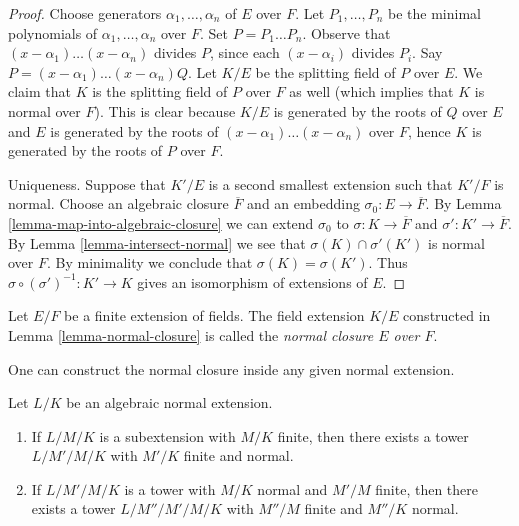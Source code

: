 \begin{proof}
Choose generators $\alpha_1, \ldots, \alpha_n$ of $E$ over $F$.
Let $P_1, \ldots, P_n$ be the minimal polynomials of
$\alpha_1, \ldots, \alpha_n$ over $F$. Set $P = P_1 \ldots P_n$.
Observe that $(x - \alpha_1) \ldots (x - \alpha_n)$ divides $P$, since
each $(x - \alpha_i)$ divides $P_i$. Say
$P = (x - \alpha_1) \ldots (x - \alpha_n)Q$.
Let $K/E$ be the splitting field of $P$ over $E$.
We claim that $K$ is the splitting field of $P$ over $F$ as well
(which implies that $K$ is normal over $F$).
This is clear because $K/E$ is generated by the roots of
$Q$ over $E$ and $E$ is generated by the roots of
$(x - \alpha_1) \ldots (x - \alpha_n)$ over $F$, hence
$K$ is generated by the roots of $P$ over $F$.

\medskip\noindent
Uniqueness. Suppose that $K'/E$ is a second smallest extension such that
$K'/F$ is normal. Choose an algebraic closure $\overline{F}$ and an
embedding $\sigma_0 : E \to \overline{F}$. By
Lemma \ref{lemma-map-into-algebraic-closure}
we can extend $\sigma_0$ to $\sigma : K \to \overline{F}$ and
$\sigma' : K' \to \overline{F}$.
By Lemma \ref{lemma-intersect-normal} we see that
$\sigma(K) \cap \sigma'(K')$ is normal over $F$.
By minimality we conclude that $\sigma(K) = \sigma(K')$.
Thus $\sigma \circ (\sigma')^{-1} : K' \to K$ gives an isomorphism
of extensions of $E$.
\end{proof}

\begin{definition}
\label{definition-normal-closure}
Let $E/F$ be a finite extension of fields. The field extension $K/E$
constructed in Lemma \ref{lemma-normal-closure}
is called the {\it normal closure $E$ over $F$}.
\end{definition}

\noindent
One can construct the normal closure inside any given normal extension.

\begin{lemma}
\label{lemma-normal-closure-inside-normal}
Let $L/K$ be an algebraic normal extension.
\begin{enumerate}
\item If $L/M/K$ is a subextension with $M/K$ finite, then there exists
a tower $L/M'/M/K$ with $M'/K$ finite and normal.
\item If $L/M'/M/K$ is a tower with $M/K$ normal and $M'/M$ finite,
then there exists a tower $L/M''/M'/M/K$ with $M''/M$
finite and $M''/K$ normal.
\end{enumerate}
\end{lemma}

